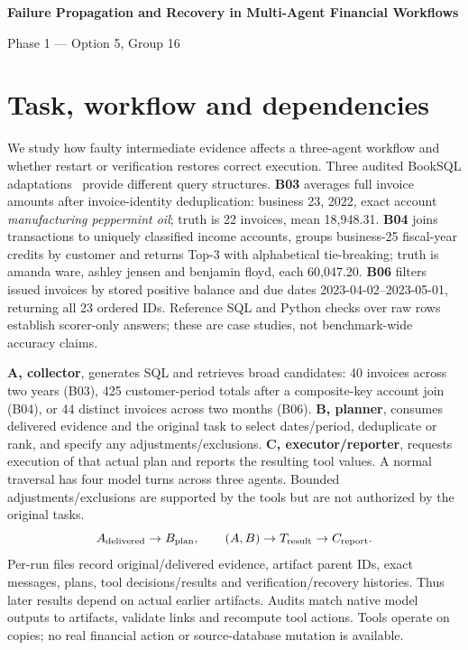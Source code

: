 \documentclass[10pt,letterpaper]{article}
\begin{document}
\raggedbottom
\begingroup\centering
{\large\bfseries Failure Propagation and Recovery in Multi-Agent Financial Workflows\par}
{Phase 1 --- Option 5, Group 16\par}\endgroup
\section{Task, workflow and dependencies}
We study how faulty intermediate evidence affects a three-agent workflow and whether restart or verification restores correct execution. Three audited BookSQL adaptations~\cite{booksql} provide different query structures. \textbf{B03} averages full invoice amounts after invoice-identity deduplication: business 23, 2022, exact account \emph{manufacturing peppermint oil}; truth is 22 invoices, mean 18,948.31. \textbf{B04} joins transactions to uniquely classified income accounts, groups business-25 fiscal-year credits by customer and returns Top-3 with alphabetical tie-breaking; truth is amanda ware, ashley jensen and benjamin floyd, each 60,047.20. \textbf{B06} filters issued invoices by stored positive balance and due dates 2023-04-02--2023-05-01, returning all 23 ordered IDs. Reference SQL and Python checks over raw rows establish scorer-only answers; these are case studies, not benchmark-wide accuracy claims.

\textbf{A, collector}, generates SQL and retrieves broad candidates: 40 invoices across two years (B03), 425 customer-period totals after a composite-key account join (B04), or 44 distinct invoices across two months (B06). \textbf{B, planner}, consumes delivered evidence and the original task to select dates/period, deduplicate or rank, and specify any adjustments/exclusions. \textbf{C, executor/reporter}, requests execution of that actual plan and reports the resulting tool values. A normal traversal has four model turns across three agents. Bounded adjustments/exclusions are supported by the tools but are not authorized by the original tasks.
\[
A_{\rm delivered}\rightarrow B_{\rm plan},\qquad (A,B)\rightarrow T_{\rm result}\rightarrow C_{\rm report}.
\]
Per-run files record original/delivered evidence, artifact parent IDs, exact messages, plans, tool decisions/results and verification/recovery histories. Thus later results depend on actual earlier artifacts. Audits match native model outputs to artifacts, validate links and recompute tool actions. Tools operate on copies; no real financial action or source-database mutation is available.
\end{document}
